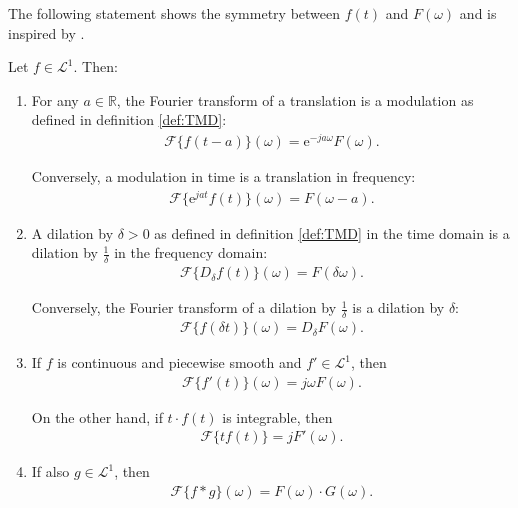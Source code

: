 \noindent
The following statement shows the symmetry between $f(t)$ and $F(\omega)$ and is inspired by \cite{page 214, FAA}.

\begin{theorem} \label{theorem:fund_sym_Fourier}
Let $f \in \mathcal{L}^1$. Then:

\begin{enumerate}[label=(\alph*)]
\item For any $a \in \mathbb{R}$, the Fourier transform of a translation is a modulation as defined in definition \ref{def:TMD}: \label{theorem:fund_sym_Fourier_a}
\begin{align*}
\mathcal{F}\{f(t-a)\}(\omega) = \text{e}^{-ja\omega} F(\omega).
\end{align*}

Conversely, a modulation in time is a translation in frequency:
\begin{align*}
\mathcal{F}\{\text{e}^{jat}f(t)\}(\omega) = F(\omega - a).
\end{align*}

\item A dilation by $\delta > 0$ as defined in definition \ref{def:TMD} in the time domain is a dilation by $\frac{1}{\delta}$ in the frequency domain:
\label{theorem:fund_sym_Fourier_b}
\begin{align*}
\mathcal{F}\{D_\delta f(t)\}(\omega) = F(\delta\omega).
\end{align*}

Conversely, the Fourier transform of a dilation by $\frac{1}{\delta}$ is a dilation by $\delta$:
\begin{align*}
\mathcal{F}\{f(\delta t)\}(\omega) = D_\delta F(\omega).
\end{align*}

\item If $f$ is continuous and piecewise smooth and $f' \in \mathcal{L}^1$, then
\begin{align*}
\mathcal{F}\{f'(t)\}(\omega) = j\omega F(\omega).
\end{align*}

On the other hand, if $t\cdot f(t)$ is integrable, then
\begin{align*}
\mathcal{F}\{tf(t)\} = j F'(\omega).
\end{align*}

\item If also $g \in \mathcal{L}^1$, then
\begin{align*}
\mathcal{F}\{f*g\}(\omega) = F(\omega) \cdot G(\omega).
\end{align*}
\end{enumerate}
\end{theorem}

